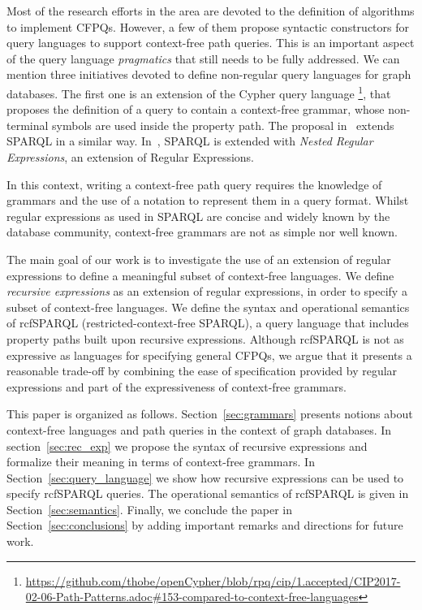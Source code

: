 \documentclass[runningheads]{llncs}
\begin{document}
Most of the research efforts in the area are devoted to the definition of algorithms to implement CFPQs. 
However, a few of them propose syntactic constructors for query languages to support context-free path queries.
This is an important aspect of the query language \emph{pragmatics} that still needs to be fully addressed. 
We can mention three initiatives devoted to define non-regular query languages for graph databases.
The first one is an extension of the Cypher query language \footnote{\url{https://github.com/thobe/openCypher/blob/rpq/cip/1.accepted/CIP2017-02-06-Path-Patterns.adoc\#153-compared-to-context-free-languages}}, that proposes the definition of a query to contain a context-free grammar, whose non-terminal symbols are used inside the property path.
The proposal in~\cite{MEDEIROS2019} extends SPARQL in a similar way.
In~\cite{nsparql}, SPARQL is extended with \textit{Nested Regular Expressions}, an extension of Regular Expressions.

In this context, writing a context-free path query requires the knowledge of grammars and the use of a notation to represent them in a query format.
Whilst regular expressions as used in SPARQL are concise and widely known by the database community, context-free grammars are not as simple nor well known.

The main goal of our work is to investigate the use of an extension of regular expressions to define a meaningful subset of context-free languages.
We define \emph{recursive expressions} as an extension of regular expressions, in order to specify a subset of context-free languages.
We define the syntax and operational semantics of \textsf{rcfSPARQL} (restricted-context-free SPARQL), a query language that includes property paths built upon recursive expressions.
Although \textsf{rcfSPARQL} is not as expressive as languages for specifying general CFPQs, we argue that it presents a reasonable trade-off by combining the ease of specification provided by regular expressions and part of the expressiveness of context-free grammars.

\medskip
This paper is organized as follows.
Section~\ref{sec:grammars} presents notions about context-free languages and path queries in the context of graph databases. 
In section~\ref{sec:rec_exp} we propose the syntax of recursive expressions and formalize their meaning in terms of context-free grammars.  
In Section~\ref{sec:query_language} we show how recursive expressions can be used to specify \textsf{rcfSPARQL} queries.  
The operational semantics of \textsf{rcfSPARQL} is given in Section~\ref{sec:semantics}.
Finally, we conclude the paper in Section~\ref{sec:conclusions} by adding important remarks and directions for future work.
\end{document}
